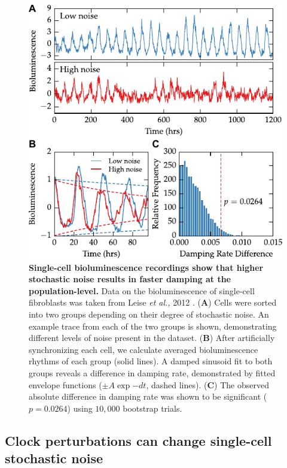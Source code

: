 \documentclass[11pt, letterpaper]{article}
\begin{document}
\begin{figure}[tbp]
  \begin{center}
    \includegraphics[]{figures/pdfs/noise_ts_and_boot.pdf}
  \end{center}
  \caption{{\bfseries Single-cell bioluminescence recordings show that higher stochastic noise results in faster damping at the population-level.}
  Data on the bioluminescence of single-cell fibroblasts was taken from Leise {\itshape et al.,} 2012 \cite{Leise2012}.
({\bfseries A}) Cells were sorted into two groups depending on their degree of stochastic noise. An example trace from each of the two groups is shown, demonstrating different levels of noise present in the dataset.
({\bfseries B}) After artificially synchronizing each cell, we calculate averaged bioluminescence rhythms of each group (solid lines). A damped sinusoid fit to both groups reveals a difference in damping rate, demonstrated by fitted envelope functions ($\pm A\exp{-dt}$, dashed lines).
({\bfseries C}) The observed absolute difference in damping rate was shown to be significant ($p = 0.0264$) using $10,000$ bootstrap trials.}
\label{fig:fibroblast_noise}
\end{figure}


\subsection*{Clock perturbations can change single-cell stochastic noise}
\end{document}
